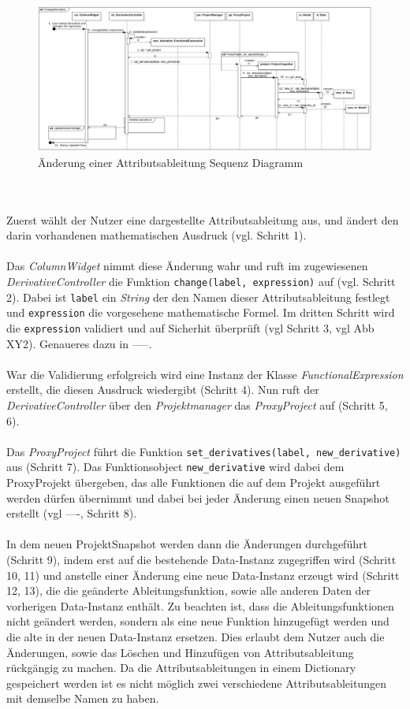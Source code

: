 \documentclass{article}
\begin{document}
\begin{itemize}
\begin{figure}[H]%
    \centering
    \includegraphics[width=13cm]{entwurf/Floriane/ChangeDerivative.png}
    \caption{Änderung einer Attributsableitung Sequenz Diagramm}
\end{figure}
\\\\
Zuerst wählt der Nutzer eine dargestellte Attributsableitung aus, und ändert den darin vorhandenen mathematischen Ausdruck (vgl. Schritt 1). \\\\Das \textit{ColumnWidget} nimmt diese Änderung wahr und ruft im zugewiesenen \textit{DerivativeController} die Funktion \texttt{change(label, expression)} auf (vgl. Schritt 2). Dabei ist \texttt{label} ein \textit{String} der den Namen dieser Attributsableitung festlegt und \texttt{expression} die vorgesehene mathematische Formel. Im dritten Schritt wird die \texttt{expression} validiert und auf Sicherhit überprüft (vgl Schritt 3, vgl Abb XY2). Genaueres dazu in -----. \\\\
War die Validierung erfolgreich wird eine Instanz der Klasse \textit{FunctionalExpression} erstellt, die diesen Ausdruck wiedergibt (Schritt 4). Nun ruft der \textit{DerivativeController} über den \textit{Projektmanager} das \textit{ProxyProject} auf (Schritt 5, 6).\\\\
Das \textit{ProxyProject} führt die Funktion \texttt{set\_derivatives(label, new\_derivative)} aus (Schritt 7). Das Funktionsobject \texttt{new\_derivative} wird dabei dem ProxyProjekt übergeben, das alle Funktionen die auf dem Projekt ausgeführt werden dürfen übernimmt und dabei bei jeder Änderung einen neuen Snapshot erstellt (vgl ----, Schritt 8).\\\\
In dem neuen ProjektSnapshot werden dann die Änderungen durchgeführt (Schritt 9), indem erst auf die bestehende Data-Instanz zugegriffen wird (Schritt 10, 11) und anstelle einer Änderung eine neue Data-Instanz erzeugt wird (Schritt 12, 13), die die geänderte Ableitungsfunktion, sowie alle anderen Daten der vorherigen Data-Instanz enthält. Zu beachten ist, dass die Ableitungsfunktionen nicht geändert werden, sondern als eine neue Funktion hinzugefügt werden und die alte in der neuen Data-Instanz ersetzen. Dies erlaubt dem Nutzer auch die Änderungen, sowie das Löschen und Hinzufügen von Attributsableitung rückgängig zu machen. Da die Attributsableitungen in einem Dictionary gespeichert werden ist es nicht möglich zwei verschiedene Attributsableitungen mit demselbe Namen zu haben.\\\\

\end{itemize}
\end{document}
